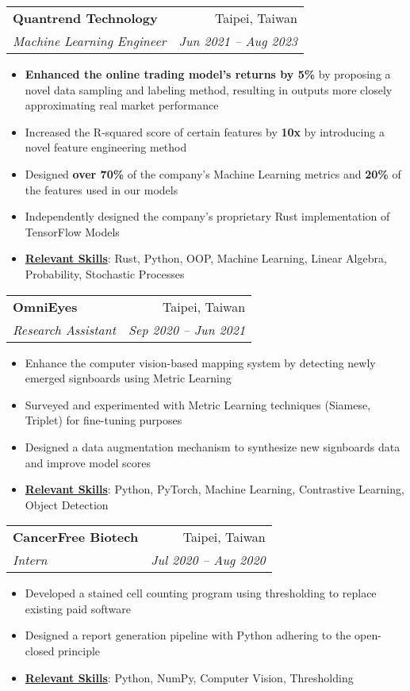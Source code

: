 \documentclass[letterpaper,11pt]{article}
\makeatletter
\newcommand{\resumeItem}[1]{
\item\small{
    {#1 \vspace{-2pt}}
  }
}
\newcommand{\resumeSubheading}[4]{
  \vspace{-2pt}
\item
  \begin{tabular*}{0.97\textwidth}[t]{l@{\extracolsep{\fill}}r}
    \textbf{#1} & #2 \\
    \textit{\small#3} & \textit{\small #4} \\
  \end{tabular*}\vspace{-7pt}
}
\newcommand{\resumeSubSubheading}[2]{
\item
  \begin{tabular*}{0.97\textwidth}{l@{\extracolsep{\fill}}r}
    \textit{\small#1} & \textit{\small #2} \\
  \end{tabular*}\vspace{-7pt}
}
\newcommand{\resumeSubHeadingListEnd}{
  \end{itemize}}
\newcommand{\resumeItemListStart}{
\begin{itemize}}
\newcommand{\resumeItemListEnd}{
  \end{itemize}\vspace{-5pt}}
\makeatother
\begin{document}

\resumeSubheading
{Quantrend Technology}{Taipei, Taiwan}
{Machine Learning Engineer}{Jun 2021 -- Aug 2023}
\resumeItemListStart
\resumeItem{\textbf{Enhanced the online trading model's returns by
  5\%} by proposing a novel data sampling and labeling method, resulting
in outputs more closely approximating real market performance}
\resumeItem{Increased the R-squared score of certain features by
\textbf{10x} by introducing a novel feature engineering method}
\resumeItem{Designed \textbf{over 70\%} of the company's Machine
Learning metrics and \textbf{20\%} of the features used in our models}
\resumeItem{Independently designed the company's proprietary Rust
implementation of TensorFlow Models}
\resumeItem{\textbf{\underline{Relevant Skills}}:
  Rust, Python, OOP, Machine Learning, Linear Algebra, Probability,
  Stochastic Processes
}
\resumeItemListEnd

\resumeSubheading
{OmniEyes}{Taipei, Taiwan}
{Research Assistant}{Sep 2020 -- Jun 2021}
\resumeItemListStart
\resumeItem{Enhance the computer vision-based mapping system by
detecting newly emerged signboards using Metric Learning}
\resumeItem{Surveyed and experimented with Metric Learning techniques
(Siamese, Triplet) for fine-tuning purposes}
\resumeItem{Designed a data augmentation mechanism to synthesize new
signboards data and improve model scores}
\resumeItem{\textbf{\underline{Relevant Skills}}:
  Python, PyTorch, Machine Learning, Contrastive Learning, Object Detection
}
\resumeItemListEnd

\resumeSubheading
{CancerFree Biotech}{Taipei, Taiwan}
{Intern}{Jul 2020 -- Aug 2020}
\resumeItemListStart
\resumeItem{Developed a stained cell counting program using
thresholding to replace existing paid software}
\resumeItem{Designed a report generation pipeline with Python
adhering to the open-closed principle}
\resumeItem{\textbf{\underline{Relevant Skills}}:
  Python, NumPy, Computer Vision, Thresholding
}
\resumeItemListEnd
\end{document}
